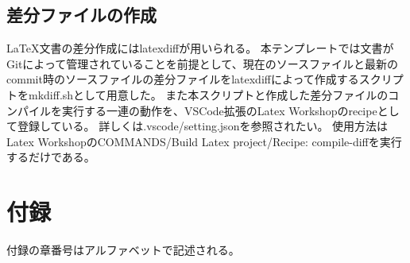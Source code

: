 \documentclass[uplatex]{jsarticle}
\begin{document}
\subsection{差分ファイルの作成}
\LaTeX 文書の差分作成にはlatexdiffが用いられる。
本テンプレートでは文書がGitによって管理されていることを前提として、現在のソースファイルと最新のcommit時のソースファイルの差分ファイルをlatexdiffによって作成するスクリプトをmkdiff.shとして用意した。
また本スクリプトと作成した差分ファイルのコンパイルを実行する一連の動作を、VSCode拡張のLatex Workshopのrecipeとして登録している。
詳しくは.vscode/setting.jsonを参照されたい。
使用方法はLatex WorkshopのCOMMANDS/Build Latex project/Recipe: compile-diffを実行するだけである。



% 



\newpage
\appendix

\section{付録}
付録の章番号はアルファベットで記述される。
\end{document}
